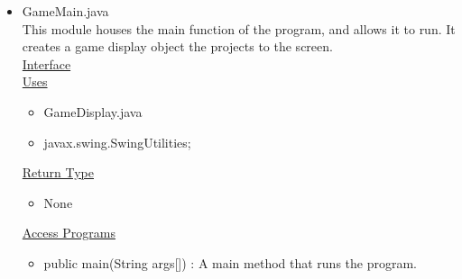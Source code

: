 \documentclass[12pt]{article}
\begin{document}
	\begin{itemize}
			\item GameMain.java \\
			This module houses the main function of the program, and allows it to run. It creates a game display object the projects to the screen.\\
			\underline{Interface} \\
			\underline{Uses}
			\begin{itemize}	
				\item GameDisplay.java
				\item javax.swing.SwingUtilities;
			\end{itemize} 
			\underline{Return Type}
			\begin{itemize}
				\item None
			\end{itemize}
			\underline{Access Programs}
			\begin{itemize}
				\item public main(String args[]) : A main method that runs the program.

			\end{itemize}
		


\end{itemize}
\end{document}
